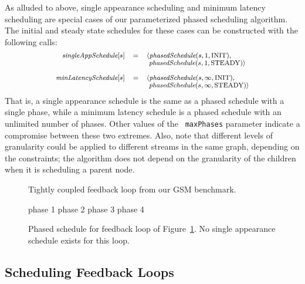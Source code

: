 As alluded to above, single appearance scheduling and minimum latency
scheduling are special cases of our parameterized phased scheduling
algorithm.  The initial and steady state schedules for these cases can
be constructed with the following calls:
\[
\small
\begin{array}{rcl}
\mt{singleAppSchedule}[s]  & = & \langle \mt{phasedSchedule}(s, 1, \mbox{INIT}), \\
                         ~ & ~ & ~ \mt{phasedSchedule}(s, 1, \mbox{STEADY}) \rangle \\ ~ \\
\mt{minLatencySchedule}[s] & = & \langle \mt{phasedSchedule}(s, \infty, \mbox{INIT}), \\
                         ~ & ~ & ~ \mt{phasedSchedule}(s, \infty, \mbox{STEADY}) \rangle
\end{array}
\]
That is, a single appearance schedule is the same as a phased schedule
with a single phase, while a minimum latency schedule is a phased
schedule with an unlimited number of phases.  Other values of the {\tt
maxPhases} parameter indicate a compromise between these two extremes.
Also, note that different levels of granularity could be applied to
different streams in the same graph, depending on the constraints; the
algorithm does not depend on the granularity of the children when it
is scheduling a parent node.

\begin{figure}[t]
\begin{center}
\caption{Tightly coupled feedback loop from our GSM benchmark.\protect\label{fig:gsm}}
\end{center}
\end{figure}

\begin{figure*}[t]

\hspace{43pt} 
phase 1 \hspace{94pt}
phase 2 \hspace{94pt}
phase 3 \hspace{94pt}
phase 4
\caption{Phased schedule for feedback loop of Figure~\ref{fig:gsm}.
No single appearance schedule exists for this
loop.\protect\label{fig:gsm-phases}}
\end{figure*}

\subsection{Scheduling Feedback Loops}

